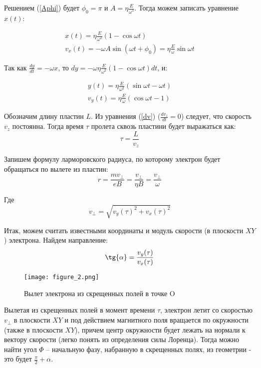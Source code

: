 Решением (\ref{Aphi}) будет $\phi_0=\pi$ и $A=\eta\frac{E}{\omega^2}$. Тогда можем записать уравнение $x(t)$:

\begin{gather}
	x(t)=\eta\frac{E}{\omega^2}(1-\cos{\omega{t}})\\
	v_x(t)=-\omega{A}\sin{(\omega{t}+\phi_0)}=\eta\frac{E}{\omega}\sin{\omega{t}}
\end{gather}

Так как $\frac{dy}{dt}=-\omega{x}$, то $dy=-\omega\eta\frac{E}{\omega^2}(1-\cos{\omega{t}}){dt}$, и:

\begin{gather}
	y(t)=\eta\frac{E}{\omega^2}(\sin{\omega{t}}-\omega{t})\\
	v_y(t)=\eta\frac{E}{\omega}(\cos\omega{t}-1)
\end{gather}

Обозначим длину пластин $L$. Из уравнения (\ref{dv}) ($\frac{dv_z}{dt}=0$) следует, что скорость $v_z$ постоянна. Тогда время $\tau$ пролета сквозь пластини будет выражаться как:
\begin{equation}
	\tau=\frac{L}{v_z}
\end{equation}

Запишем формулу ларморовского радиуса, по которому электрон будет обращаться по вылете из пластин:
\begin{equation}
	r=\frac{mv_\perp}{eB}=\frac{v_\perp}{\eta{B}}=\frac{v_\perp}{\omega}
\end{equation}

Где 
\begin{equation}
	v_\perp=\sqrt{v_y(\tau)^2+v_x(\tau)^2}
\end{equation}

Итак, можем считать известными координаты и модуль скорости (в плоскости $XY$) электрона. Найдем направление:
\begin{equation}
	\tg{\alpha}=\frac{v_y(\tau)}{v_x(\tau)}
\end{equation}

\begin{figure}[h]
	\centering
	\texttt{[image: figure\_2.png]}
	\caption{Вылет электрона из скрещенных полей в точке O}
	\label{fig:figure1}
\end{figure}

Вылетая из скрещенных полей в момент времени $\tau$, электрон летит со скоростью $v_\perp$ в плоскости $XY$ и под действием магнитного поля вращается по окружности (также в плоскости $XY$), причем центр окружности будет лежать на нормали к вектору скорости (легко понять из определения силы Лоренца). Тогда можно найти угол $\Phi$ -- начальную фазу, набранную в скрещенных полях, из геометрии - это будет $\frac{\pi}{2}+\alpha$.


